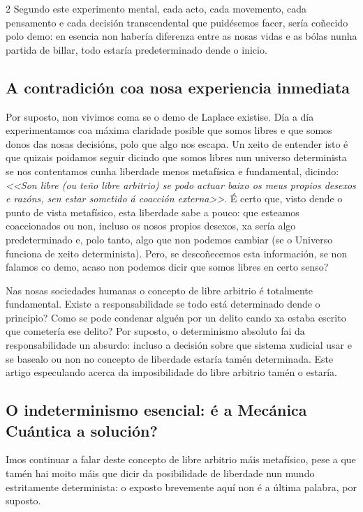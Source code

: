 \begin{multicols}{2}
Segundo este experimento mental, cada acto, cada movemento, cada pensamento e
cada decisión transcendental que puidésemos facer, sería coñecido polo demo: en
esencia non habería diferenza entre as nosas vidas e as bólas nunha partida de
billar, todo estaría predeterminado dende o inicio.

\subsection*{A contradición coa nosa experiencia inmediata}

Por suposto, non vivimos coma se o demo de Laplace existise. Día a día
experimentamos coa máxima claridade posible que somos libres e que somos donos
das nosas decisións, polo que algo nos escapa. Un xeito de entender isto é que
quizais poidamos seguir dicindo que somos libres nun universo determinista se
nos contentamos cunha liberdade menos metafísica e fundamental, dicindo:
\textit{<<Son libre (ou teño libre arbitrio) se podo actuar baixo os meus
propios desexos e razóns, sen estar sometido á coacción externa>>}. É certo
que, visto dende o punto de vista metafísico, esta liberdade sabe a pouco: que
esteamos coaccionados ou non, incluso os nosos propios desexos, xa sería algo
predeterminado e, polo tanto, algo que non podemos cambiar (se o Universo
funciona de xeito determinista). Pero, se descoñecemos esta información, se non
falamos co demo, acaso non podemos dicir que somos libres en certo senso?

Nas nosas sociedades humanas o concepto de libre arbitrio é totalmente
fundamental. Existe a responsabilidade se todo está determinado dende o
principio? Como se pode condenar alguén por un delito cando xa estaba escrito
que cometería ese delito? Por suposto, o determinismo absoluto fai da
responsabilidade un absurdo: incluso a decisión sobre que sistema xudicial usar
e se basealo ou non no concepto de liberdade estaría tamén determinada. Este
artigo especulando acerca da imposibilidade do libre arbitrio tamén o estaría.

\subsection*{O indeterminismo esencial: é a Mecánica Cuántica a solución?}

Imos continuar a falar deste concepto de libre arbitrio máis metafísico, pese a
que tamén hai moito máis que dicir da posibilidade de liberdade nun mundo
estritamente determinista: o exposto brevemente aquí non é a última palabra,
por suposto.


\end{multicols}
